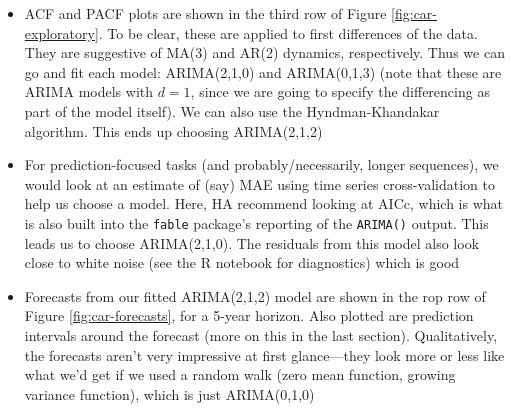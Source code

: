 \documentclass{article}
\begin{document}
\begin{itemize}
\item ACF and PACF plots are shown in the third row of Figure
  \ref{fig:car-exploratory}. To be clear, these are applied to first differences
  of the data. They are suggestive of MA(3) and AR(2) dynamics,
  respectively. Thus we can go and fit each model: ARIMA(2,1,0) and ARIMA(0,1,3)
  (note that these are ARIMA models with $d=1$, since we are going to specify
  the differencing as part of the model itself). We can also use the
  Hyndman-Khandakar algorithm. This ends up choosing ARIMA(2,1,2)   

\item For prediction-focused tasks (and probably/necessarily, longer sequences),
  we would look at an estimate of (say) MAE using time series cross-validation
  to help us choose a model. Here, HA recommend looking at AICc, which is what
  is also built into the \verb|fable| package's reporting of the \verb|ARIMA()| 
  output. This leads us to choose ARIMA(2,1,0). The residuals from this model
  also look close to white noise (see the R notebook for diagnostics) which is
  good  

\item Forecasts from our fitted ARIMA(2,1,2) model are shown in the rop row of
  Figure \ref{fig:car-forecasts}, for a 5-year horizon. Also plotted are
  prediction intervals around the forecast (more on this in the last 
  section). Qualitatively, the forecasts aren't very impressive at first
  glance---they look more or less like what we'd get if we used a random walk
  (zero mean function, growing variance function), which is just ARIMA(0,1,0)   


\end{itemize}
\end{document}
